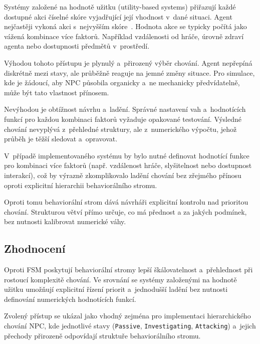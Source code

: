 Systémy založené na hodnotě užitku (utility-based systems) přiřazují každé
dostupné akci číselné skóre vyjadřující její vhodnost v~dané situaci. 
Agent nejčastěji vykoná akci s~nejvyšším skóre~\cite[s.~379]{millington2006}. 
Hodnota akce se typicky počítá jako vážená kombinace více faktorů. 
Například vzdálenosti od hráče, úrovně zdraví agenta nebo dostupnosti předmětů v~prostředí.

Výhodou tohoto přístupu je plynulý a~přirozený výběr chování. Agent nepřepíná diskrétně mezi stavy, ale průběžně reaguje 
na jemné změny situace. Pro simulace, kde je žádoucí, aby NPC působila organicky a~ne mechanicky předvídatelně, může být tato vlastnost přínosem.

Nevýhodou je obtížnost návrhu a~ladění. Správné nastavení vah a~hodnotících funkcí pro každou kombinaci faktorů vyžaduje opakované testování. 
Výsledné chování nevyplývá z~přehledné struktury, ale z~numerického výpočtu, jehož průběh je těžší sledovat a~opravovat.

V~případě implementovaného systému by bylo nutné definovat hodnotící funkce pro kombinaci 
více faktorů (např. vzdálenost hráče, slyšitelnost nebo dostupnost interakcí), což by výrazně zkomplikovalo ladění chování
bez zřejmého přínosu oproti explicitní hierarchii behaviorálního stromu.

Oproti tomu behaviorální strom dává návrháři explicitní kontrolu nad prioritou chování. 
Strukturou větví přímo určuje, co má přednost a za jakých podmínek, bez nutnosti kalibrovat numerické váhy.

\subsection{Zhodnocení}

Oproti FSM poskytují behaviorální stromy lepší škálovatelnost a~přehlednost při rostoucí komplexitě chování. 
Ve srovnání se systémy založenými na hodnotě užitku umožňují explicitní řízení priorit a~jednodušší ladění bez nutnosti 
definování numerických hodnotících funkcí.

Zvolený přístup se ukázal jako vhodný zejména pro implementaci hierarchického chování NPC, kde jednotlivé 
stavy (\texttt{Passive}, \texttt{Investigating}, \texttt{Attacking}) a~jejich přechody 
přirozeně odpovídají struktuře behaviorálního stromu.
